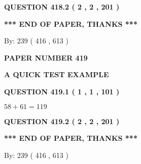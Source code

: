 \documentclass[12pt]{article}
\begin{document}
{\textbf{\Large{QUESTION
418.2 
 ( 2 , 2 , 201 )
}}}
  
  
   
   
 \vspace{0.2in}
 
   
   
   
   
\vspace{1.0in} 
{\textbf{\large{ *** END OF PAPER, THANKS *** }}} 
   
   
\hspace{1.0in} By: 
 239 ( 416 ,  613 )
   
   
   
   
\newpage 
\setcounter{page}{ 
   419001 } 
   
   
   
   
 {\textbf{ \Large{ PAPER NUMBER  419  }}}
   
   
\vspace{0.2in}
   
   
   
   
   
   
 \vspace{0.2in}
{\LARGE {\textbf{ A QUICK TEST EXAMPLE}}}
   
   
  
\vspace{0.2in}
  
{\textbf{\Large{QUESTION
419.1 
 ( 1 , 1 , 101 )
}}}
  
  
 
 

$ %
58 +  %
61=   %
119$
 
 
  
\vspace{0.2in}
  
{\textbf{\Large{QUESTION
419.2 
 ( 2 , 2 , 201 )
}}}
  
  
   
   
 \vspace{0.2in}
 
   
   
   
   
\vspace{1.0in} 
{\textbf{\large{ *** END OF PAPER, THANKS *** }}} 
   
   
\hspace{1.0in} By: 
 239 ( 416 ,  613 )
   
   
   
   
\newpage 
\setcounter{page}{ 
   420001 } 
   
\end{document}
